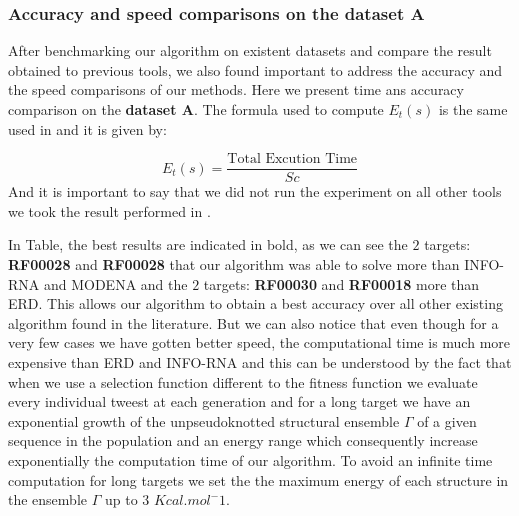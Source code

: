\documentclass[english,12pt,a4paper]{article}
\theoremstyle{definition}
\begin{document}
\subsubsection{Accuracy and speed comparisons on the dataset A}

After benchmarking our algorithm on existent datasets and compare the result obtained to previous tools, we also found important to address the accuracy and the speed comparisons of our methods. Here we present time ans accuracy comparison on the \textbf{dataset A}. The formula used to compute $E_t(s)$ is the same used in \cite{esmaili2015erd} and it is given by: 

$$
	E_t(s) = \frac{ \text{Total Excution Time}}{Sc}
$$
And it is important to say that we did not run the experiment on all other tools we took the result performed in \cite{esmaili2015erd}. 

In Table, the best results are indicated in bold, as we can see the $2$ targets: \textbf{RF00028} and \textbf{RF00028} that our algorithm was able to solve more than INFO-RNA and MODENA and the $2$ targets: \textbf{RF00030} and \textbf{RF00018} more than ERD. This allows our algorithm to obtain a best accuracy over all other existing algorithm found in the literature. But we can also notice that even though for a very few cases we have gotten better speed, the computational time is much more expensive than ERD and INFO-RNA and this can be understood by the fact that when we use a selection function different to the fitness function we evaluate every individual tweest at each generation and for a long target we have an exponential growth of the unpseudoknotted structural ensemble $ \Gamma$ of a given sequence in the population and an energy range which consequently increase exponentially the computation time of our algorithm. To avoid an infinite time computation for long targets we set the the maximum energy of each structure in the ensemble $\Gamma$ up to $3$  $Kcal.mol^-1$.
\end{document}
